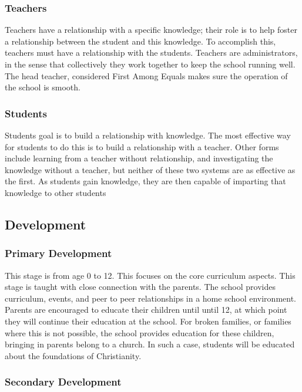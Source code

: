 \documentclass[CSHFoundation.tex]{subfiles}
\begin{document}
\subsubsection{Teachers}

Teachers have a relationship with a specific knowledge; their role is to help foster a relationship between the student and this knowledge. To accomplish this, teachers must have a relationship with the students. Teachers are administrators, in the sense that collectively they work together to keep the school running well. The head teacher, considered First Among Equals makes sure the operation of the school is smooth.

\subsubsection{Students}

Students goal is to build a relationship with knowledge. The most effective way for students to do this is to build a relationship with a teacher. Other forms include learning from a teacher without relationship, and investigating the knowledge without a teacher, but neither of these two systems are as effective as the first. As students gain knowledge, they are then capable of imparting that knowledge to other students

\subsection{Development}

\subsubsection{Primary Development}

This stage is from age 0 to 12. This focuses on the core curriculum aspects. This stage is taught with close connection with the parents. The school provides curriculum, events, and peer to peer relationships in a home school environment. Parents are encouraged to educate their children until until 12, at which point they will continue their education at the school. For broken families, or families where this is not possible, the school provides education for these children, bringing in parents belong to a church. In such a case, students will be educated about the foundations of Christianity.

\subsubsection{Secondary Development}
\end{document}
